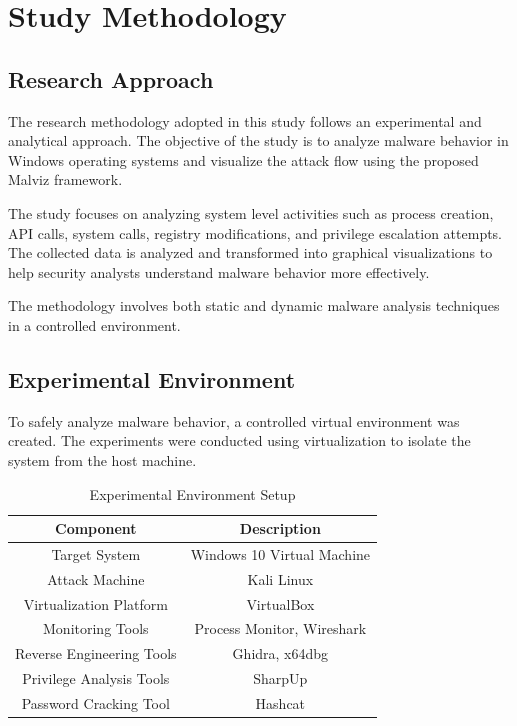 
\chapter{Study Methodology}\doublespacing %

\label{Chapter3} %


\section{Research Approach}

The research methodology adopted in this study follows an experimental and analytical approach. 
The objective of the study is to analyze malware behavior in Windows operating systems and 
visualize the attack flow using the proposed Malviz framework.

The study focuses on analyzing system level activities such as process creation, API calls, 
system calls, registry modifications, and privilege escalation attempts. The collected data 
is analyzed and transformed into graphical visualizations to help security analysts understand 
malware behavior more effectively.

The methodology involves both static and dynamic malware analysis techniques in a controlled 
environment.


\section{Experimental Environment}

To safely analyze malware behavior, a controlled virtual environment was created. 
The experiments were conducted using virtualization to isolate the system from 
the host machine.

\begin{table}[H]
\centering
\begin{tabular}{|c|c|}
\hline
Component & Description \\
\hline
Target System & Windows 10 Virtual Machine \\
Attack Machine & Kali Linux \\
Virtualization Platform & VirtualBox \\
Monitoring Tools & Process Monitor, Wireshark \\
Reverse Engineering Tools & Ghidra, x64dbg \\
Privilege Analysis Tools & SharpUp \\
Password Cracking Tool & Hashcat \\
\hline
\end{tabular}
\caption{Experimental Environment Setup}
\end{table}

